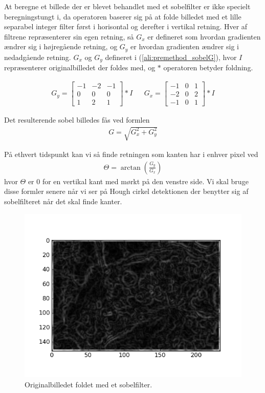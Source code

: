 At beregne et billede der er blevet behandlet med et sobelfilter er ikke specielt beregningstungt i, da operatoren baserer sig på at folde billedet med et lille separabel integer filter først i horisontal og derefter i vertikal retning. Hver af filtrene repræsenterer sin egen retning, så $G_x$ er defineret som hvordan gradienten ændrer sig i højregående retning, og $G_y$ er hvordan gradienten ændrer sig i nedadgående retning. $G_x$ og $G_y$ defineret i  (\ref{ali:premethod_sobelG}), hvor $I$ repræsenterer originalbilledet der foldes med, og $*$ operatoren betyder foldning.

\begin{align}
	G_y = \begin{bmatrix}
		-1 & -2 & -1\\
		0 & 0 & 0\\
		1 & 2 & 1
	\end{bmatrix} * I
	&&
	G_x = \begin{bmatrix}
		-1 & 0 & 1\\
		-2 & 0 & 2\\
		-1 & 0 & 1
	\end{bmatrix} * I
	\label{ali:premethod_sobelG}
\end{align} 

Det resulterende sobel billedes fås ved formlen 
\begin{align}
	G = \sqrt{G_x^2 + G_y^2}
\end{align}

På ethvert tidspunkt kan vi så finde retningen som kanten har i enhver pixel ved 
\begin{align}
	\Theta = \arctan\left(\frac{G_y}{G_x}\right)
	\label{ali:premethod_sobelTheta}
\end{align}
hvor $\Theta$ er 0 for en vertikal kant med mørkt på den venstre side. Vi skal bruge disse formler senere når vi ser på Hough cirkel detektionen der benytter sig af sobelfilteret når det skal finde kanter. 

\begin{figure}[H]
	\centering
	\includegraphics[scale=0.8]{files/premethod/img/sobel.png}
	\caption{Originalbilledet foldet med et sobelfilter.\label{fig:premethod_sobel}}
\end{figure}

